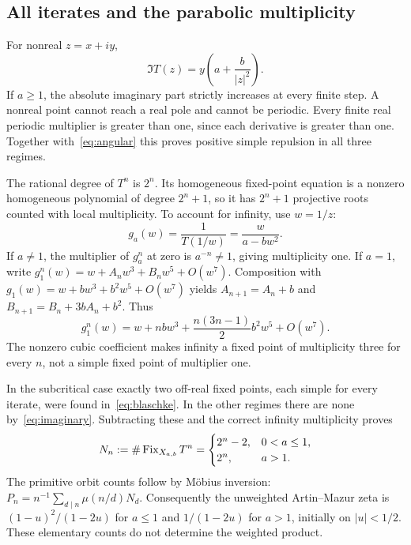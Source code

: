 \subsection{All iterates and the parabolic multiplicity}

For nonreal $z=x+iy$,
\begin{equation}\label{eq:imaginary}
 \Im T(z)=y\left(a+\frac b{|z|^2}\right).
\end{equation}
If $a\ge1$, the absolute imaginary part strictly increases at every finite
step. A nonreal point cannot reach a real pole and cannot be periodic.
Every finite real periodic multiplier is greater than one, since each
derivative is greater than one. Together with~\eqref{eq:angular} this proves
positive simple repulsion in all three regimes.

The rational degree of $T^n$ is $2^n$. Its homogeneous fixed-point equation
is a nonzero homogeneous polynomial of degree $2^n+1$, so it has $2^n+1$
projective roots counted with local multiplicity. To account for infinity,
use $w=1/z$:
\begin{equation}\label{eq:local}
 g_a(w)=\frac1{T(1/w)}=\frac{w}{a-bw^2}.
\end{equation}
If $a\ne1$, the multiplier of $g_a^n$ at zero is $a^{-n}\ne1$, giving
multiplicity one. If $a=1$, write
$g_1^n(w)=w+A_nw^3+B_nw^5+O(w^7)$. Composition with
$g_1(w)=w+bw^3+b^2w^5+O(w^7)$ yields
$A_{n+1}=A_n+b$ and $B_{n+1}=B_n+3bA_n+b^2$. Thus
\begin{equation}\label{eq:jet}
 g_1^n(w)=w+nbw^3+\frac{n(3n-1)}2 b^2w^5+O(w^7).
\end{equation}
The nonzero cubic coefficient makes infinity a fixed point of multiplicity
three for every $n$, not a simple fixed point of multiplier one.

In the subcritical case exactly two off-real fixed points, each simple for
every iterate, were found in~\eqref{eq:blaschke}. In the other regimes there
are none by~\eqref{eq:imaginary}. Subtracting these and the correct infinity
multiplicity proves
\begin{equation}\label{eq:counts}
 N_n:=\#\operatorname{Fix}_{X_{a,b}}T^n=
 \begin{cases}2^n-2,&0<a\le1,\\2^n,&a>1.\end{cases}
\end{equation}
The primitive orbit counts follow by M\"obius inversion:
$P_n=n^{-1}\sum_{d\mid n}\mu(n/d)N_d$. Consequently the unweighted
Artin--Mazur zeta is $(1-u)^2/(1-2u)$ for $a\le1$ and $1/(1-2u)$ for $a>1$,
initially on $|u|<1/2$. These elementary counts do not determine the weighted
product.
